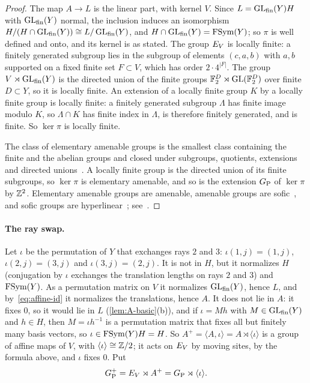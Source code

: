 \begin{proof}
The map $A\to L$ is the linear part, with kernel $V$. Since $L=\operatorname{GL}_{\rm fin}(Y)H$ with $\operatorname{GL}_{\rm fin}(Y)$ normal, the inclusion induces an
isomorphism $H/(H\cap\operatorname{GL}_{\rm fin}(Y))\cong L/\operatorname{GL}_{\rm fin}(Y)$, and $H\cap\operatorname{GL}_{\rm fin}(Y)=\operatorname{FSym}(Y)$; so $\pi$ is well defined and onto, and
its kernel is as stated. The group $E_V$ is locally finite: a finitely generated subgroup lies in the subgroup of elements $(c,a,b)$ with
$a,b$ supported on a fixed finite set $F\subset V$, which has order $2\cdot4^{|F|}$. The group $V\rtimes\operatorname{GL}_{\rm fin}(Y)$ is the directed
union of the finite groups $\mathbb F_2^D\rtimes\operatorname{GL}(\mathbb F_2^D)$ over finite $D\subset Y$, so it is locally finite. An extension of a locally finite
group $K$ by a locally finite group is locally finite: a finitely generated subgroup $\Lambda$ has finite image modulo $K$, so $\Lambda\cap K$
has finite index in $\Lambda$, is therefore finitely generated, and is finite. So $\ker\pi$ is locally finite.

The class of elementary amenable groups is the smallest class containing the finite and the abelian groups and closed under subgroups,
quotients, extensions and directed unions~\cite{Cho80}. A locally finite group is the directed union of its finite subgroups, so $\ker\pi$
is elementary amenable, and so is the extension $G_{\mathrm P}$ of $\ker\pi$ by $\mathbb Z^2$. Elementary amenable groups are amenable, amenable groups are
sofic~\cite{Gro99,Wei00}, and sofic groups are hyperlinear~\cite{ES05}; see~\cite{Pes08}.
\end{proof}

\paragraph{The ray swap.} Let $\iota$ be the permutation of $Y$ that exchanges rays $2$ and $3$: $\iota(1,j)=(1,j)$, $\iota(2,j)=(3,j)$ and
$\iota(3,j)=(2,j)$. It is not in $H$, but it normalizes $H$ (conjugation by $\iota$ exchanges the translation lengths on rays $2$ and $3$)
and $\operatorname{FSym}(Y)$. As a permutation matrix on $V$ it normalizes $\operatorname{GL}_{\rm fin}(Y)$, hence $L$, and by~\eqref{eq:affine-id} it normalizes the
translations, hence $A$. It does not lie in $A$: it fixes $0$, so it would lie in $L$ (\cref{lem:A-basic}(b)), and if $\iota=Mh$
with $M\in\operatorname{GL}_{\rm fin}(Y)$ and $h\in H$, then $M=\iota h^{-1}$ is a permutation matrix that fixes all but finitely many basis vectors, so
$\iota\in\operatorname{FSym}(Y)H=H$. So $A^+=\langle A,\iota\rangle=A\rtimes\langle\iota\rangle$ is a group of affine maps of $V$, with
$\langle\iota\rangle\cong\mathbb Z/2$; it acts on $E_V$ by moving sites, by the formula above, and $\iota$ fixes $0$. Put
\[
G_{\mathrm P}^{+}=E_V\rtimes A^+=G_{\mathrm P}\rtimes\langle\iota\rangle .
\]

